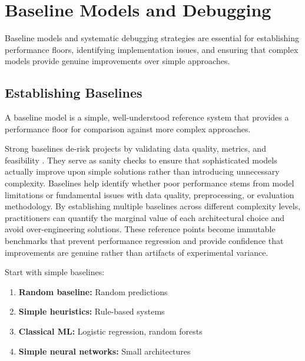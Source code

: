 
\section{Baseline Models and Debugging }
\label{sec:baselines-debugging}

Baseline models and systematic debugging strategies are essential for establishing performance floors, identifying implementation issues, and ensuring that complex models provide genuine improvements over simple approaches.

\subsection{Establishing Baselines}

\begin{definition}
A baseline model is a simple, well-understood reference system that provides a performance floor for comparison against more complex approaches.
\end{definition} Strong baselines de-risk projects by validating data quality, metrics, and feasibility \textcite{GoodfellowEtAl2016,Prince2023}. They serve as sanity checks to ensure that sophisticated models actually improve upon simple solutions rather than introducing unnecessary complexity. Baselines help identify whether poor performance stems from model limitations or fundamental issues with data quality, preprocessing, or evaluation methodology. By establishing multiple baselines across different complexity levels, practitioners can quantify the marginal value of each architectural choice and avoid over-engineering solutions. These reference points become immutable benchmarks that prevent performance regression and provide confidence that improvements are genuine rather than artifacts of experimental variance. 

Start with simple baselines:
\begin{enumerate}
    \item \textbf{Random baseline:} Random predictions
    \item \textbf{Simple heuristics:} Rule-based systems
    \item \textbf{Classical ML:} Logistic regression, random forests
    \item \textbf{Simple neural networks:} Small architectures
\end{enumerate}

